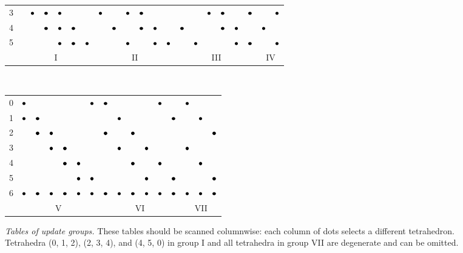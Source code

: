 \documentclass[smallcondensed]{svjour3}
\begin{document}
\begin{figure}
{\begin{tabular}{c|cccccc|cccccc|cccccc|cc}
      3 & & $\bullet$ & $\bullet$ & $\bullet$ & & & $\bullet$ & & $\bullet$ & $\bullet$ & & & & & $\bullet$ & $\bullet$ & & $\bullet$ & & $\bullet$ \\
      4 & & & $\bullet$ & $\bullet$ & $\bullet$ & & & $\bullet$ & & $\bullet$ & $\bullet$ & & $\bullet$ & & & $\bullet$ & $\bullet$ & & $\bullet$ & \\
      5 & & & & $\bullet$ & $\bullet$ & $\bullet$ & & & $\bullet$ & & $\bullet$ & $\bullet$ & & $\bullet$ & & & $\bullet$ & $\bullet$ & & $\bullet$ \\
      \multicolumn{1}{c}{} & \multicolumn{6}{c}{I} & \multicolumn{6}{c}{II} & \multicolumn{6}{c}{III} & \multicolumn{2}{c}{IV}
    \end{tabular} \\
    \vspace{1em}
    \begin{tabular}{c|cccccc|cccccc|ccc}
      0 & $\bullet$ & & & & & $\bullet$ & $\bullet$ & & & & $\bullet$ & & $\bullet$ & & \\
      1 & $\bullet$ & $\bullet$ & & & & & & $\bullet$ & & & & $\bullet$ & & $\bullet$ & \\
      2 & & $\bullet$ & $\bullet$ & & & & $\bullet$ & & $\bullet$ & & & & & & $\bullet$ \\
      3 & & & $\bullet$ & $\bullet$ & & & & $\bullet$ & & $\bullet$ & & & $\bullet$ & & \\
      4 & & & & $\bullet$ & $\bullet$ & & & & $\bullet$ & & $\bullet$ & & & $\bullet$ & \\
      5 & & & & & $\bullet$ & $\bullet$ & & & & $\bullet$ & & $\bullet$ & & & $\bullet$ \\
      6 & $\bullet$ & $\bullet$ & $\bullet$ & $\bullet$ & $\bullet$ & $\bullet$ & $\bullet$ & $\bullet$ & $\bullet$ & $\bullet$ & $\bullet$ & $\bullet$ & $\bullet$ & $\bullet$ & $\bullet$ \\
      \multicolumn{1}{c}{} & \multicolumn{6}{c}{V} & \multicolumn{6}{c}{VI} & \multicolumn{3}{c}{VII}
    \end{tabular}%
  }
  \caption{\emph{Tables of update groups.} These tables should be
    scanned columnwise: each column of dots selects a different
    tetrahedron. Tetrahedra (0, 1, 2), (2, 3, 4), and (4, 5, 0) in
    group I and all tetrahedra in group VII are degenerate and can be
    omitted.}\label{fig:tetrahedra-groups}
\end{figure}
\end{document}
